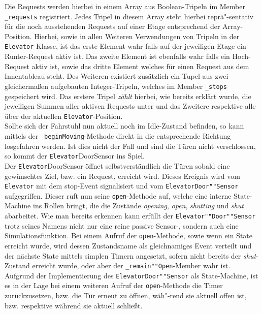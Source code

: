 Die Requests werden hierbei in einem Array aus Boolean-Tripeln im Member \texttt{\_requests} registriert.
Jedes Tripel in diesem Array steht hierbei reprä"-sentativ für die noch ausstehenden Requests auf einer Etage entsprechend der Array-Position.
Hierbei, sowie in allen Weiteren Verwendungen von Tripeln in der \texttt{Elevator}-Klasse, ist das erste Element wahr falls auf der jeweiligen Etage ein Runter-Request aktiv ist.
Das zweite Element ist ebenfalls wahr falls ein Hoch-Request aktiv ist, sowie das dritte Element welches für einen Request aus dem Innentableau steht.
Des Weiteren existiert zusätzlich ein Tupel aus zwei gleichermaßen aufgebauten Integer-Tripeln, welches im Member \texttt{\_stops} gespeichert wird.
Das erstere Tripel \textit{zählt} hierbei, wie bereits erklärt wurde, die jeweiligen Summen aller aktiven Requests unter und das Zweitere respektive alle über der aktuellen \texttt{Elevator}-Position. \\

Sollte sich der Fahrstuhl nun aktuell noch im Idle-Zustand befinden, so kann mittels der \texttt{\_beginMoving}-Methode direkt in die entsprechende Richtung losgefahren werden.
Ist dies nicht der Fall und sind die Türen nicht verschlossen, so kommt der \texttt{Elevator}DoorSensor ins Spiel. \\

Der \texttt{Elevator}DoorSensor öffnet selbstverständlich die Türen sobald eine gewünschtes Ziel, bzw. ein Request, erreicht wird.
Dieses Ereignis wird vom \texttt{Elevator} mit dem \glqq stop\grqq-Event signalisiert und vom \texttt{ElevatorDoor""Sensor} aufgegriffen.
Dieser ruft nun seine \texttt{open}-Methode auf, welche eine interne State-Machine ins Rollen bringt, die die Zustände \textit{opening}, \textit{open}, \textit{shutting} und \textit{shut} abarbeitet.
Wie man bereits erkennen kann erfüllt der \texttt{Elevator""Door""Sensor} trotz seines Namens nicht nur eine reine passive Sensor-, sondern auch eine Simulationsfunktion.
Bei einem Aufruf der \texttt{open}-Methode, sowie wenn ein State erreicht wurde, wird dessen Zustandsname als gleichnamiges Event verteilt und der nächste State mittels simplen Timern angesetzt, sofern nicht bereits der \textit{shut}-Zustand erreicht wurde, oder aber der \texttt{\_remain""Open}-Member wahr ist.
Aufgrund der Implementierung des \texttt{ElevatorDoor""Sensor} als State-Machine, ist es in der Lage bei einem weiteren Aufruf der \texttt{open}-Methode die Timer zurückzusetzen, bzw. die Tür erneut zu öffnen, wäh"-rend sie aktuell offen ist, bzw. respektive während sie aktuell schließt. \\

